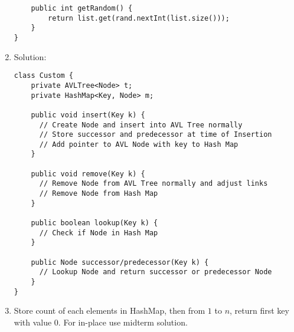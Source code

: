 \documentclass[12pt, a4paper]{article}
\begin{document}
\begin{enumerate}[Q\arabic*.]
\begin{lstlisting}
    public int getRandom() {
        return list.get(rand.nextInt(list.size()));
    }
}
  \end{lstlisting}
\pagebreak
\item Solution: 
    \begin{lstlisting}
class Custom {
    private AVLTree<Node> t;
    private HashMap<Key, Node> m;

    public void insert(Key k) {
      // Create Node and insert into AVL Tree normally
      // Store successor and predecessor at time of Insertion
      // Add pointer to AVL Node with key to Hash Map
    }

    public void remove(Key k) {
      // Remove Node from AVL Tree normally and adjust links
      // Remove Node from Hash Map 
    }
    
    public boolean lookup(Key k) {
      // Check if Node in Hash Map
    }

    public Node successor/predecessor(Key k) {
      // Lookup Node and return successor or predecessor Node
    }
}
    \end{lstlisting}

  \item Store count of each elements in HashMap, then from $1$ to $n$, return first key with value $0$. For in-place use midterm solution.

\end{enumerate}
\end{document}
